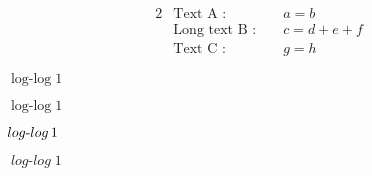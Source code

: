 \documentclass[11pt]{article}
\begin{document}

% 
% 

\begin{alignat}{2}
& \text{Text A : } && a = b \\
& \text{Long text B : } && c = d+e+f \\
& \text{Text C : } && g = h
\end{alignat}

$\operatorname{log-log} 1$

$\mathit{\operatorname{log-log}} 1$

$\operatorname{\mathnormal{log-log}} 1$

$\operatorname{\mathit{log-log}} 1$
\end{document}
